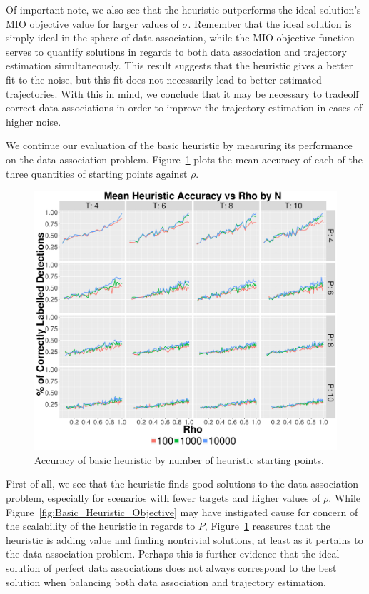 Of important note, we also see that the heuristic outperforms the ideal solution's MIO objective value for larger values of $\sigma$. Remember that the ideal solution is simply ideal in the sphere of data association, while the MIO objective function serves to quantify solutions in regards to both data association and trajectory estimation simultaneously. This result suggests that the heuristic gives a better fit to the noise, but this fit does not necessarily lead to better estimated trajectories. With this in mind, we conclude that it may be necessary to tradeoff correct data associations in order to improve the trajectory estimation in cases of higher noise.

We continue our evaluation of the basic heuristic by measuring its performance on the data association problem. Figure~\ref{fig:Basic_Heuristic_Accuracy} plots the mean accuracy of each of the three quantities of starting points against $\rho$. 
\begin{figure}[ht]
  \centering
  \includegraphics[width=\columnwidth]{../Figures/Basic_Heuristic_Accuracy}
  \caption{Accuracy of basic heuristic by number of heuristic starting points.}
  \label{fig:Basic_Heuristic_Accuracy}
\end{figure}

First of all, we see that the heuristic finds good solutions to the data association problem, especially for scenarios with fewer targets and higher values of $\rho$. While Figure~\ref{fig:Basic_Heuristic_Objective} may have instigated cause for concern of the scalability of the heuristic in regards to $P$, Figure~\ref{fig:Basic_Heuristic_Accuracy} reassures that the heuristic is adding value and finding nontrivial solutions, at least as it pertains to the data association problem. Perhaps this is further evidence that the ideal solution of perfect data associations does not always correspond to the best solution when balancing both data association and trajectory estimation.


